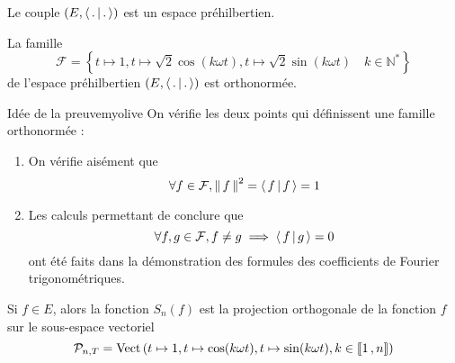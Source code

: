     \begin{coro}{}{}
        Le couple $\left(E, \left<\,.\,\middle|\,.\,\right>\right)$ est un espace préhilbertien.
    \end{coro}

    \begin{prop}{}{}
        La famille 
        \[ \mathcal{F} = \left\{ t \mapsto 1, t \mapsto \sqrt{2} \cos(k \omega t), t \mapsto \sqrt{2} \sin (k \omega t) \quad k \in \mathbb{N}^* \right\}\] 
        de l’espace préhilbertien $\left(E, \left<\,.\,\middle|\,.\,\right>\right)$ est orthonormée.
    \end{prop}

    \begin{demo}{Idée de la preuve}{myolive}
        On vérifie les deux points qui définissent une famille orthonormée : 
        \begin{enumerate}
            \item On vérifie aisément que 
            \[ \forall f \in \mathcal{F}, \left\lVert\,f\,\right\rVert^2 = \left<\,f\,\middle|\,f\,\right> = 1 \]
            \item Les calculs permettant de conclure que 
            \[ \forall f,g \in \mathcal{F}, f \neq g \implies \left<\,f\,\middle|\,g\,\right> = 0 \] ont été faits dans la démonstration des formules des coefficients de Fourier trigonométriques.
        \end{enumerate}
    \end{demo}

    \begin{coro}{}{}
        Si $f \in E$, alors la fonction $S_n(f)$ est la projection orthogonale de la fonction $f$ sur le sous-espace vectoriel 
        \[ \mathcal{P}_{n,T} = \operatorname{Vect}\left(t \mapsto 1, t \mapsto \cos(k \omega t), t \mapsto \sin (k \omega t), k \in \left\llbracket 1 \, , n \right\rrbracket \right) \]
    \end{coro}

